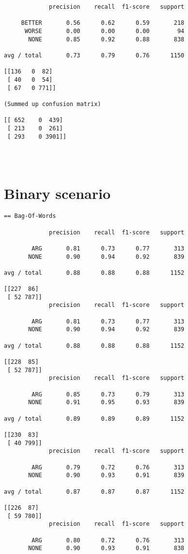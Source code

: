 \begin{appendices}
\begin{verbatim}
             precision    recall  f1-score   support

     BETTER       0.56      0.62      0.59       218
      WORSE       0.00      0.00      0.00        94
       NONE       0.85      0.92      0.88       838

avg / total       0.73      0.79      0.76      1150

[[136   0  82]
 [ 40   0  54]
 [ 67   0 771]]
 
(Summed up confusion matrix)

[[ 652    0  439]
 [ 213    0  261]
 [ 293    0 3901]]


 
\end{verbatim}
\section{Binary scenario}
\begin{verbatim}
== Bag-Of-Words

             precision    recall  f1-score   support

        ARG       0.81      0.73      0.77       313
       NONE       0.90      0.94      0.92       839

avg / total       0.88      0.88      0.88      1152

[[227  86]
 [ 52 787]]
             precision    recall  f1-score   support

        ARG       0.81      0.73      0.77       313
       NONE       0.90      0.94      0.92       839

avg / total       0.88      0.88      0.88      1152

[[228  85]
 [ 52 787]]
             precision    recall  f1-score   support

        ARG       0.85      0.73      0.79       313
       NONE       0.91      0.95      0.93       839

avg / total       0.89      0.89      0.89      1152

[[230  83]
 [ 40 799]]
             precision    recall  f1-score   support

        ARG       0.79      0.72      0.76       313
       NONE       0.90      0.93      0.91       839

avg / total       0.87      0.87      0.87      1152

[[226  87]
 [ 59 780]]
             precision    recall  f1-score   support

        ARG       0.80      0.72      0.76       313
       NONE       0.90      0.93      0.91       838


\end{verbatim}
\end{appendices}
